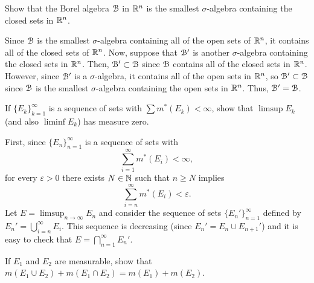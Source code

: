 \begin{problem}
  Show that the Borel algebra $\mathcal{B}$ in $\mathbb{R}^n$ is the smallest
  $\sigma$-algebra containing the closed sets in $\mathbb{R}^n$.
\end{problem}
\begin{solution}
  Since $\mathcal{B}$ is the smallest $\sigma$-algebra containing all of the open
  sets of $\mathbb{R}^n$, it contains all of the closed sets of $\mathbb{R}^n$. Now,
  suppose that $\mathcal{B}'$ is another $\sigma$-algebra containing the closed
  sets in $\mathbb{R}^n$. Then, $\mathcal{B}'\subset\mathcal{B}$ since $\mathcal{B}$ contains all
  of the closed sets in $\mathbb{R}^n$. However, since $\mathcal{B}'$ is a
  $\sigma$-algebra, it contains all of the open sets in $\mathbb{R}^n$, so
  $\mathcal{B}'\subset\mathcal{B}$ since $\mathcal{B}$ is the smallest $\sigma$-algebra
  containing the open sets in $\mathbb{R}^n$. Thus, $\mathcal{B}'=\mathcal{B}$.
\end{solution}

\begin{problem}
  If ${\{E_k\}}_{k=1}^\infty$ is a sequence of sets with
  $\sum m^*(E_k)<\infty$, show that $\limsup E_k$ (and also $\liminf E_k$)
  has measure zero.
\end{problem}
\begin{solution}
  First, since
  ${\{E_n\}}_{n=1}^\infty$ is a sequence of sets with
  \[
    \sum_{i=1}^\infty m^*(E_i)<\infty,
  \]
  for every $\varepsilon>0$ there exists $N\in\mathbb{N}$ such that $n\geq N$
  implies
  \[
    \sum_{i=n}^\infty m^*(E_i)<\varepsilon.
  \]
  Let $E=\limsup_{n\to\infty} E_n$ and consider the sequence of sets
  ${\{E_n'\}}_{n=1}^\infty$ defined by $E_n'=\bigcup_{i=n}^\infty
  E_i$. This sequence is decreasing (since $E_n'=E_n\cup E_{n+1}'$) and it
  is easy to check that $E=\bigcap_{n=1}^\infty E_n'$.
\end{solution}

\begin{problem}
  If $E_1$ and $E_2$ are measurable, show that
  $m(E_1\cup E_2)+m(E_1\cap E_2)=m(E_1)+m(E_2)$.
\end{problem}
\begin{solution}
\end{solution}


